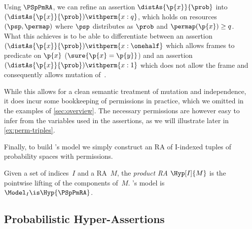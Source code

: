 \documentclass[acmsmall,nonacm,screen,appendix]{acmart}
\begin{document}
\begin{example}
\label{ex:perm-ra}
  Using $\PSpPmRA$,
  we can refine an assertion
  $\distAs{\p{x}}{\prob}$ into
  $(\distAs{\p{x}}{\prob})\withperm{x:q}$,
  which holds on resources $(\psp, \permap)$ where $\psp$ distributes 
  as $\prob$ and $\permap(\p{x})\geq q$.
  What this achieves is to be able to differentiate between an assertion
  $(\distAs{\p{x}}{\prob})\withperm{x:\onehalf}$ which allows frames to predicate on $\p{x}$ (\eg $\sure{\p{x}=\p{y}}$) and
  an assertion $(\distAs{\p{x}}{\prob})\withperm{x:1}$ which does not allow the
  frame and consequently allows mutation of~.
\end{example}

While this allows for a clean semantic treatment of mutation and independence,
it does incur some bookkeeping of permissions in practice,
which we omitted in the examples of \cref{sec:overview}.
The necessary permissions are however easy to infer
from the variables used in the assertions,
as we will illustrate later in \cref{ex:perm-triples}.

Finally, to build \thelogic's model we simply construct an RA
of \pre I-indexed tuples of probability spaces with permissions.

\begin{definition}[\thelogic\ RA]
Given a set of indices~$I$ and a RA~$M$,
  the \emph{product RA} $ \Hyp[I]{M} $ is the pointwise lifting
  of the components of~$M$.
\thelogic's model is $\Model_I \is \Hyp{\PSpPmRA}$.
\end{definition}

\subsection{Probabilistic Hyper-Assertions}
\label{sec:prob-assert}
\end{document}
